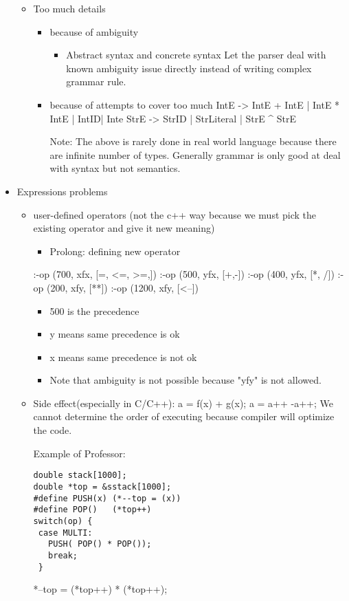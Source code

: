 \documentclass[11pt]{article}
\begin{document}
\begin{itemize}
\begin{itemize}
\item Too much details 
\begin{itemize}
\item because of ambiguity
\begin{itemize}
\item Abstract syntax and concrete syntax
Let the parser deal with known ambiguity issue directly instead of writing
complex grammar rule.
\end{itemize}
\item because of attempts to cover too much
IntE -> IntE + IntE | IntE * IntE | IntID| Inte
StrE -> StrID | StrLiteral | StrE \^{} StrE

Note: The above is rarely done in real world language because there are
infinite number of types. Generally grammar is only good at deal with
syntax but not semantics.
\end{itemize}
\end{itemize}

\item Expressions problems

\begin{itemize}
\item user-defined operators (not the c++ way because we must pick the existing
operator and give it new meaning)

\begin{itemize}
\item Prolong: defining new operator
\end{itemize}
:-op (700, xfx, [=, <=, >=,])
:-op (500, yfx, [+,-])
:-op (400, yfx, [*, /])
:-op (200, xfy, [**])
:-op (1200, xfy, [<--])

\begin{itemize}
\item 500 is the precedence
\item y means same precedence is ok
\item x means same precedence is not ok

\item Note that ambiguity is not possible because "yfy" is not allowed.
\end{itemize}

\item Side effect(especially in C/C++): a = f(x) + g(x);
a = a++ -a++;
We cannot determine the order of executing because compiler will optimize
the code.

Example of Professor:
\begin{verbatim}
double stack[1000];
double *top = &sstack[1000];
#define PUSH(x) (*--top = (x))
#define POP()   (*top++)
switch(op) {
 case MULTI:
   PUSH( POP() * POP());
   break;
 }
\end{verbatim}
*--top = (*top++) * (*top++);
\end{itemize}
\end{itemize}
\end{document}
